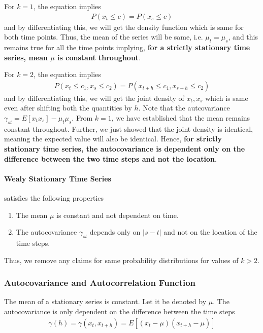 \documentclass[../main.tex]{subfiles}
\begin{document}
    For $k = 1$, the equation implies
    \begin{align*}
        P(x_{t} \leq c) = P(x_{s} \leq c)
    \end{align*}
    and by differentiating this, we will get the density function which is same for both time points. Thus, the mean of the series will be same, i.e. $\mu_{t} = \mu_{s}$, and this remains true for all the time points implying, \textbf{for a strictly stationary time series, mean $\mu$ is constant throughout}.\newline

    For $k=2$, the equation implies
    \begin{align*}
        P(x_{t} \leq c_{1}, x_{s} \leq c_{2}) = P(x_{t+h} \leq c_{1}, x_{s+h} \leq c_{2})
    \end{align*}
    and by differentiating this, we will get the joint density of $x_{t}, x_{s}$ which is same even after shifting both the quantities by $h$. Note that the autcovariance $\gamma_{st} = E[x_{t} x_{s}] - \mu_{t} \mu_{s}$. From $k=1$, we have established that the mean remains constant throughout. Further, we just showed that the joint density is identical, meaning the expected value will also be identical. Hence, \textbf{for strictly stationary time series, the autocovariance is dependent only on the difference between the two time steps and not the location}.\newline

    \paragraph{Wealy Stationary Time Series} satisfies the following properties
    \begin{enumerate}
        \item The mean $\mu$ is constant and not dependent on time.
        \item The autocovariance $\gamma_{st}$ depends only on $\lvert s - t \rvert$ and not on the location of the time steps.
    \end{enumerate}
    Thus, we remove any claims for same probability distributions for values of $k > 2$.\newline

    \subsubsection{Autocovariance and Autocorrelation Function}
    The mean of a stationary series is constant. Let it be denoted by $\mu$.\newline
    The autocovariance is only dependent on the difference between the time steps
    \begin{align*}
        \gamma (h) = \gamma(x_{t}, x_{t+h}) = E[(x_{t} - \mu)(x_{t+h} - \mu)]
    \end{align*}
\end{document}
